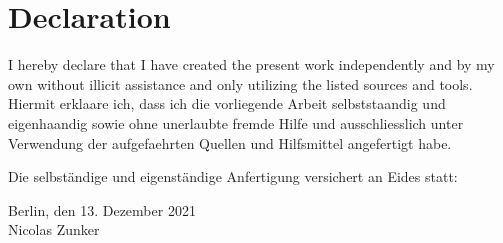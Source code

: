 
\cleardoublepage
\section*{Declaration}
I hereby declare that I have created the present work independently and by my own without illicit assistance and only utilizing the listed sources and tools.\\

Hiermit erklaare ich, dass ich die vorliegende Arbeit selbststaandig und eigenhaandig sowie ohne unerlaubte fremde Hilfe und ausschliesslich unter Verwendung der aufgefaehrten Quellen und Hilfsmittel angefertigt habe.

Die selbständige und eigenständige Anfertigung versichert an Eides statt:
\begin{center}
Berlin, den 13. Dezember 2021\\[3pc]
Nicolas Zunker
\end{center}
